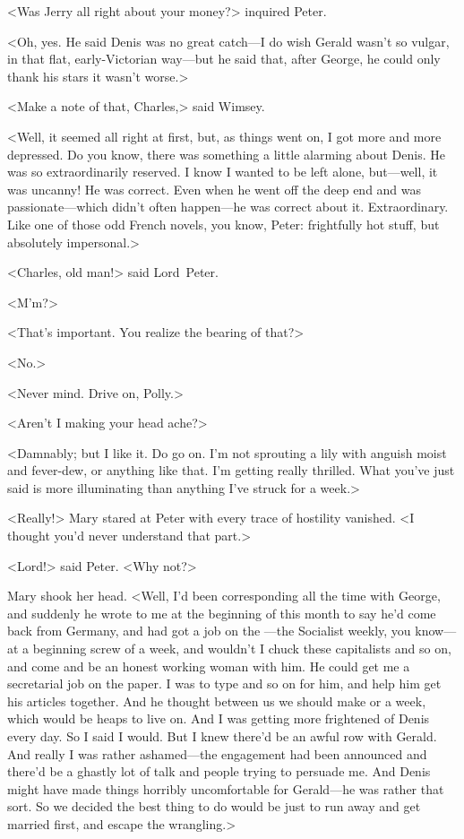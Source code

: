 <Was Jerry all right about your money?> inquired Peter.

<Oh, yes. He said Denis was no great catch—I do wish Gerald wasn't so vulgar, in that flat, early-Victorian way—but he said that, after George, he could only thank his stars it wasn't worse.>

<Make a note of that, Charles,> said Wimsey.

<Well, it seemed all right at first, but, as things went on, I got more and more depressed. Do you know, there was something a little alarming about Denis. He was so extraordinarily reserved. I know I wanted to be left alone, but—well, it was uncanny! He was correct. Even when he went off the deep end and was passionate—which didn't often happen—he was correct about it. Extraordinary. Like one of those odd French novels, you know, Peter: frightfully hot stuff, but absolutely impersonal.>

<Charles, old man!> said Lord~Peter.

<M'm?>

<That's important. You realize the bearing of that?>

<No.>

<Never mind. Drive on, Polly.>

<Aren't I making your head ache?>

<Damnably; but I like it. Do go on. I'm not sprouting a lily with anguish moist and fever-dew, or anything like that. I'm getting really thrilled. What you've just said is more illuminating than anything I've struck for a week.>

<Really!> Mary stared at Peter with every trace of hostility vanished.  <I thought you'd never understand that part.>

<Lord!> said Peter. <Why not?>

Mary shook her head. <Well, I'd been corresponding all the time with George, and suddenly he wrote to me at the beginning of this month to say he'd come back from Germany, and had got a job on the —the Socialist weekly, you know—at a beginning screw of  a week, and wouldn't I chuck these capitalists and so on, and come and be an honest working woman with him. He could get me a secretarial job on the paper. I was to type and so on for him, and help him get his articles together. And he thought between us we should make  or  a week, which would be heaps to live on. And I was getting more frightened of Denis every day. So I said I would. But I knew there'd be an awful row with Gerald. And really I was rather ashamed—the engagement had been announced and there'd be a ghastly lot of talk and people trying to persuade me. And Denis might have made things horribly uncomfortable for Gerald—he was rather that sort. So we decided the best thing to do would be just to run away and get married first, and escape the wrangling.>

